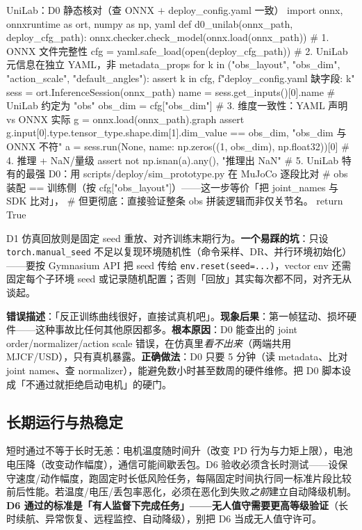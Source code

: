 \begin{codebox}[Python]{UniLab：D0 静态核对（查 ONNX $+$ deploy\_config.yaml 一致）}
import onnx, onnxruntime as ort, numpy as np, yaml
def d0_unilab(onnx_path, deploy_cfg_path):
    onnx.checker.check_model(onnx.load(onnx_path))            # 1. ONNX 文件完整性
    cfg = yaml.safe_load(open(deploy_cfg_path))               # 2. UniLab 元信息在独立 YAML，非 metadata_props
    for k in ("obs_layout", "obs_dim", "action_scale", "default_angles"):
        assert k in cfg, f"deploy_config.yaml 缺字段: {k}"
    sess = ort.InferenceSession(onnx_path)
    name = sess.get_inputs()[0].name                          # UniLab 约定为 "obs"
    obs_dim = cfg["obs_dim"]                                  # 3. 维度一致性：YAML 声明 vs ONNX 实际
    g = onnx.load(onnx_path).graph
    assert g.input[0].type.tensor_type.shape.dim[1].dim_value == obs_dim, "obs_dim 与 ONNX 不符"
    a = sess.run(None, {name: np.zeros((1, obs_dim), np.float32)})[0]   # 4. 推理 + NaN/量级
    assert not np.isnan(a).any(), "推理出 NaN"
    # 5. UniLab 特有的最强 D0：用 scripts/deploy/sim_prototype.py 在 MuJoCo 逐段比对
    #    obs 装配 == 训练侧（按 cfg["obs_layout"]）——这一步等价「把 joint_names 与 SDK 比对」，
    #    但更彻底：直接验证整条 obs 拼装逻辑而非仅关节名。
    return True
\end{codebox}

D1 仿真回放则是固定 seed 重放、对齐训练末期行为。\textbf{一个易踩的坑}：只设 \verb|torch.manual_seed| 不足以复现环境随机性（命令采样、DR、并行环境初始化）——要按 Gymnasium API 把 seed 传给 \verb|env.reset(seed=...)|，vector env 还需固定每个子环境 seed 或记录随机配置；否则「回放」其实每次都不同，对齐无从谈起。

\begin{pitfall}[跳过 D0 直接上真机]
\textbf{错误描述}：「反正训练曲线很好，直接试真机吧」。\textbf{现象后果}：第一帧猛动、损坏硬件——这种事故比任何其他原因都多。\textbf{根本原因}：D0 能查出的 joint order/normalizer/action scale 错误，在仿真里\emph{看不出来}（两端共用 MJCF/USD），只有真机暴露。\textbf{正确做法}：D0 只要 5 分钟（读 metadata、比对 joint names、查 normalizer），能避免数小时甚至数周的硬件维修。把 D0 脚本设成「不通过就拒绝启动电机」的硬门。
\end{pitfall}

\subsection{长期运行与热稳定}
\label{sec:rlmc-s2r-thermal}

短时通过不等于长时无恙：电机温度随时间升（改变 PD 行为与力矩上限），电池电压降（改变动作幅度），通信可能间歇丢包。D6 验收必须含长时测试——设保守速度/动作幅度，跑固定时长低风险任务，每隔固定时间执行同一标准片段比较前后性能。若温度/电压/丢包率恶化，必须在恶化到失败\emph{之前}建立自动降级机制。\textbf{D6 通过的标准是「有人监督下完成任务」——无人值守需要更高等级验证}（长时续航、异常恢复、远程监控、自动降级），别把 D6 当成无人值守许可。

